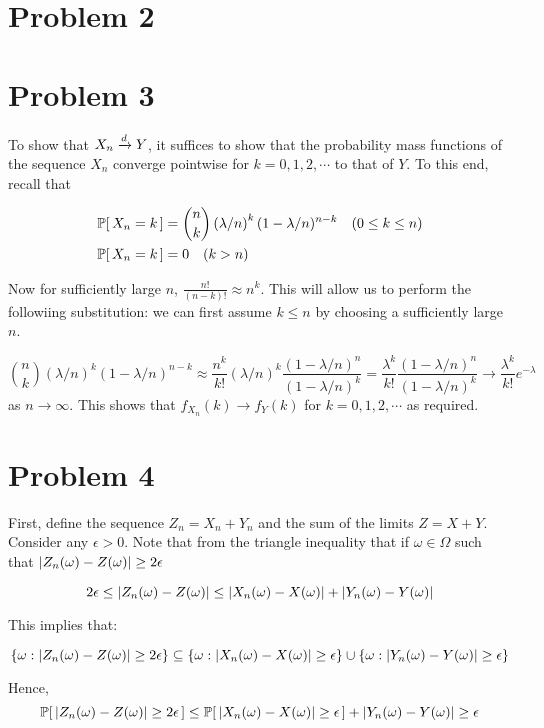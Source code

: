 \documentclass[12pt]{article}%
\begin{document}
\section{Problem 2}

\section{Problem 3}
To show that $X_n \xrightarrow[]{d} Y$, it suffices to show that the probability mass functions of the sequence $X_n$ converge pointwise for $k = 0,1,2,\cdots$ to that of $Y$. To this end, recall that

\begin{align*}
  \mathbb{P}[\,X_n = k\,] & = {n \choose k}\left(\lambda/n\right)^k(1 - \lambda/n)^{n-k} \quad (0 \leq k \leq n) \\
  \mathbb{P}[\,X_n = k\,] & = 0 \quad (k > n)
\end{align*}

Now for sufficiently large $n$, $\frac{n!}{(n-k)!} \approx n^k$. This will allow us to perform the followiing substitution: we can first assume $k \leq n$ by choosing a sufficiently large $n$.

\[{n \choose k}\left(\lambda/n\right)^k(1 - \lambda/n)^{n-k} \approx \frac{n^k }{k!}(\lambda/n)^k \frac{(1-\lambda/n)^{n}}{(1-\lambda/n)^{k}}  = \frac{\lambda^k}{k!}\frac{(1-\lambda/n)^{n}}{(1-\lambda/n)^{k}} \rightarrow \frac{\lambda^k}{k!}e^{-\lambda}  \]
as $n \rightarrow \infty$. This shows that $f_{X_n}(k) \rightarrow f_Y(k)$ for $k = 0,1,2, \cdots$ as required.

\section{Problem 4}
First, define the sequence $Z_n = X_n + Y_n$ and the sum of the limits $Z = X + Y$. Consider any $\epsilon >0$. Note that from the triangle inequality that if $\omega \in \Omega$ such that $\abs{Z_n(\omega) - Z(\omega)} \geq 2\epsilon$

\[ 2 \epsilon \leq \abs{Z_n(\omega) - Z(\omega)} \leq \abs{X_n(\omega) - X(\omega)} + \abs{Y_n(\omega) - Y(\omega)} \]

This implies that:

\[ \{\omega : \abs{Z_n(\omega) - Z(\omega)} \geq 2\epsilon\} \subseteq \{\omega :\abs{X_n(\omega) - X(\omega)} \geq \epsilon \} \cup \{\omega :\abs{Y_n(\omega) - Y(\omega)} \geq \epsilon \}  \]

Hence,
\[ \mathbb{P}[\,\abs{Z_n(\omega) - Z(\omega)} \geq 2\epsilon\,] \leq \mathbb{P}[\,\abs{X_n(\omega) - X(\omega)} \geq \epsilon\,] + \abs{Y_n(\omega) - Y(\omega)} \geq \epsilon \]
\end{document}
